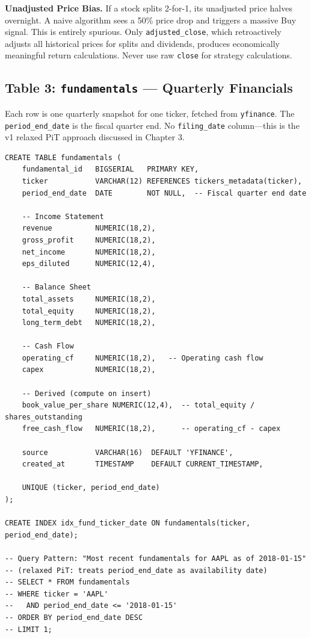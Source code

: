 \documentclass[11pt, oneside]{book}
\begin{document}
\begin{warningbox}
\textbf{Unadjusted Price Bias.} If a stock splits 2-for-1, its unadjusted price halves overnight. A naive algorithm sees a 50\% price drop and triggers a massive Buy signal. This is entirely spurious. Only \texttt{adjusted\_close}, which retroactively adjusts all historical prices for splits and dividends, produces economically meaningful return calculations. Never use raw \texttt{close} for strategy calculations.
\end{warningbox}

\subsection{Table 3: \texttt{fundamentals} --- Quarterly Financials}

Each row is one quarterly snapshot for one ticker, fetched from \texttt{yfinance}. The \texttt{period\_end\_date} is the fiscal quarter end. No \texttt{filing\_date} column---this is the v1 relaxed PiT approach discussed in Chapter 3.

\begin{lstlisting}[style=sqlstyle, caption={Simplified Fundamentals Schema (yfinance-sourced)}]
CREATE TABLE fundamentals (
    fundamental_id   BIGSERIAL   PRIMARY KEY,
    ticker           VARCHAR(12) REFERENCES tickers_metadata(ticker),
    period_end_date  DATE        NOT NULL,  -- Fiscal quarter end date

    -- Income Statement
    revenue          NUMERIC(18,2),
    gross_profit     NUMERIC(18,2),
    net_income       NUMERIC(18,2),
    eps_diluted      NUMERIC(12,4),

    -- Balance Sheet
    total_assets     NUMERIC(18,2),
    total_equity     NUMERIC(18,2),
    long_term_debt   NUMERIC(18,2),

    -- Cash Flow
    operating_cf     NUMERIC(18,2),   -- Operating cash flow
    capex            NUMERIC(18,2),

    -- Derived (compute on insert)
    book_value_per_share NUMERIC(12,4),  -- total_equity / shares_outstanding
    free_cash_flow   NUMERIC(18,2),      -- operating_cf - capex

    source           VARCHAR(16)  DEFAULT 'YFINANCE',
    created_at       TIMESTAMP    DEFAULT CURRENT_TIMESTAMP,

    UNIQUE (ticker, period_end_date)
);

CREATE INDEX idx_fund_ticker_date ON fundamentals(ticker, period_end_date);

-- Query Pattern: "Most recent fundamentals for AAPL as of 2018-01-15"
-- (relaxed PiT: treats period_end_date as availability date)
-- SELECT * FROM fundamentals
-- WHERE ticker = 'AAPL'
--   AND period_end_date <= '2018-01-15'
-- ORDER BY period_end_date DESC
-- LIMIT 1;
\end{lstlisting}
\end{document}
